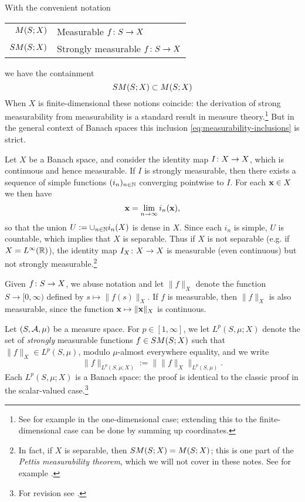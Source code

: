 With the convenient notation
\begin{center}
  \begin{tabular}{r|l}
    $M (S;X)$  & Measurable $f \colon S \rightarrow X$    \\
    $SM(S;X)$  & Strongly measurable $f \colon S \rightarrow X$   
  \end{tabular}
\end{center}
we have the containment
\begin{equation}\label{eq:measurability-inclusions}
  SM(S;X) \subset M(S;X)
\end{equation}
When $X$ is finite-dimensional these notions coincide: the derivation of strong measurability from measurability is a standard result in measure theory.\footnote{See for example \cite[Corollary 4.2.7]{rD04} in the one-dimensional case; extending this to the finite-dimensional case can be done by summing up coordinates.} %
But in the general context of Banach spaces this inclusion \eqref{eq:measurability-inclusions} is strict.

\begin{example}
  Let $X$ be a Banach space, and consider the identity map $I \colon X \rightarrow X$, which is continuous and hence measurable.
  If $I$ is strongly measurable, then there exists a sequence of simple functions $(i_n)_{n \in \mathbb{N}}$ converging pointwise to $I$.
  For each $\mathbf{x} \in X$ we then have
  \begin{equation*}
    \mathbf{x} = \lim_{n \to \infty} i_n(\mathbf{x}),
  \end{equation*}
  so that the union $U := \cup_{n \in \mathbb{N}} i_n(X)$ is dense in $X$.
  Since each $i_n$ is simple, $U$ is countable, which implies that $X$ is separable.
  Thus if $X$ is not separable (e.g. if $X = L^\infty(\mathbb{R})$), the identity map $I_X \colon X \rightarrow X$ is measurable (even continuous) but not strongly measurable.\footnote{In fact, if $X$ is separable, then $SM(S;X) = M(S;X)$; this is one part of the \emph{Pettis measurability theorem}, which we will not cover in these notes. See for example \cite[Theorem 1.1.6]{HNVW16}.}
\end{example}


Given $f \colon S \rightarrow X$, we abuse notation and let $\|f\|_X$ denote the function $S \to [0,\infty)$ defined by $s \mapsto \|f(s)\|_X$.
If $f$ is measurable, then $\|f\|_X$ is also measurable, since the function $\mathbf{x} \mapsto \|\mathbf{x}\|_X$ is continuous.

\begin{defn}
  Let $(S,\mathcal{A},\mu)$ be a measure space.
  For $p \in [1,\infty]$, we let $L^p(S,\mu;X)$ denote the set of \emph{strongly} measurable functions $f \in SM(S;X)$ such that $\|f\|_X \in L^p(S,\mu)$, modulo $\mu$-almost everywhere equality, and we write
  \begin{equation*}
    \|f\|_{L^p(S,\mu;X)} := \| \|f\|_X \|_{L^p(S,\mu)}.
  \end{equation*}
  Each $L^p(S,\mu;X)$ is a Banach space: the proof is identical to the classic proof in the scalar-valued case.\footnote{For revision see \cite[Theorem 5.2.1]{rD04}.}
\end{defn}

